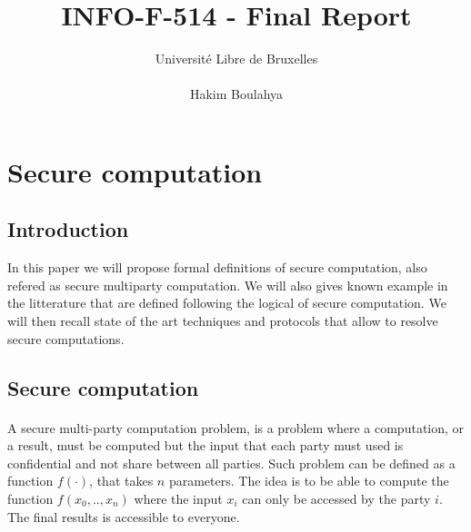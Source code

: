 \documentclass[11pt,a4paper]{article}
\title{INFO-F-514 - Final Report}
\author{Université Libre de Bruxelles \\
\\ Hakim Boulahya}
\begin{document}
\maketitle
\tableofcontents

\newpage


\section{Secure computation}

\subsection{Introduction}

In this paper we will propose formal definitions of secure
computation, also refered as secure multiparty computation.
We will also gives known example in the litterature
that are defined following the logical of secure computation.
We will then recall
state of the art techniques and protocols that allow
to resolve secure computations.

\subsection{Secure computation}

\paragraph{}

A secure multi-party computation problem, is a problem where a computation,
or a result, must be computed but the input that each party must used
is confidential and not share between all parties. Such problem
can be defined as a function $f(\cdot)$, that takes $n$ parameters.
The idea is to be able to compute the function $f(x_0, .., x_n)$
where the input $x_i$ can only be accessed by the party $i$.
The final results is accessible to everyone.

\paragraph{}
\end{document}
